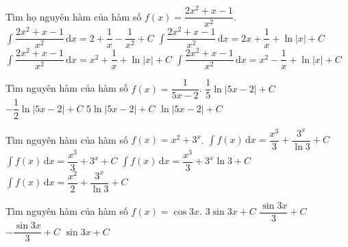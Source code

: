 \begin{ex}%
 Tìm họ nguyên hàm của hàm số $f(x)=\dfrac{2x^2+x-1}{x^2}$.
 \choice
 {$\displaystyle\int \dfrac{2x^2+x-1}{x^2}\,\text{d}x = 2 + \dfrac{1}{x} - \dfrac{1}{x^2} + C$}
 {\True $\displaystyle\int \dfrac{2x^2+x-1}{x^2}\,\text{d}x = 2x + \dfrac{1}{x} + \ln|x| + C$}
 {$\displaystyle\int \dfrac{2x^2+x-1}{x^2}\,\text{d}x = x^2 + \dfrac{1}{x} + \ln|x| + C$}
 {$\displaystyle\int \dfrac{2x^2+x-1}{x^2}\,\text{d}x = x^2 - \dfrac{1}{x} + \ln|x| + C$}
\end{ex}
\begin{ex}%
 Tìm nguyên hàm của hàm số $f(x)=\dfrac{1}{5x-2}$.
 \choice
 {\True $\dfrac{1}{5} \ln |5x-2|+C$}
 {$-\dfrac{1}{2} \ln |5x-2|+C$}
 {$5 \ln |5x-2|+C$}
 {$\ln |5x-2|+C$}
\end{ex}
\begin{ex}%
 Tìm nguyên hàm của hàm số $f(x)=x^2+3^x$.
 \choice
 {\True $\displaystyle\int f(x)\,\text{d}x = \dfrac{x^3}{3} + \dfrac{3^x}{\ln 3} + C$}
 {$\displaystyle\int f(x)\,\text{d}x = \dfrac{x^3}{3} + 3^x + C$}
 {$\displaystyle\int f(x)\,\text{d}x = \dfrac{x^3}{3} + 3^x \ln 3 + C$}
 {$\displaystyle\int f(x)\,\text{d}x = \dfrac{x^2}{2} + \dfrac{3^x}{\ln 3} + C$}
\end{ex}
\begin{ex}%
 Tìm nguyên hàm của hàm số $f(x)=\cos 3x$.
 \choice
 {$3 \sin 3x+C$}
 {\True $\dfrac{\sin 3x}{3}+C$}
 {$-\dfrac{\sin 3x}{3}+C$}
 {$\sin 3x+C$}
\end{ex}
